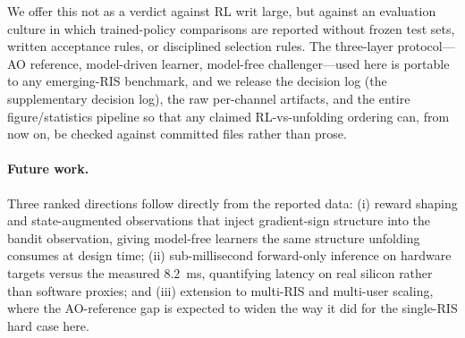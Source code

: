 We offer this not as a verdict against RL writ large, but against an
evaluation culture in which trained-policy comparisons are reported
without frozen test sets, written acceptance rules, or disciplined
selection rules. The three-layer protocol---AO reference,
model-driven learner, model-free challenger---used here is portable to
any emerging-RIS benchmark, and we release the decision log
(the supplementary decision log), the raw per-channel artifacts, and the entire
figure/statistics pipeline so that any claimed RL-vs-unfolding
ordering can, from now on, be checked against committed files rather
than prose.

\paragraph{Future work.} Three ranked directions follow directly from
the reported data: (i) reward shaping and state-augmented
observations that inject gradient-sign structure into the bandit
observation, giving model-free learners the same structure unfolding
consumes at design time; (ii) sub-millisecond forward-only inference
on hardware targets versus the measured $8.2$~ms, quantifying latency
on real silicon rather than software proxies; and (iii) extension to
multi-RIS and multi-user scaling, where the AO-reference gap is expected
to widen the way it did for the single-RIS hard case here.
